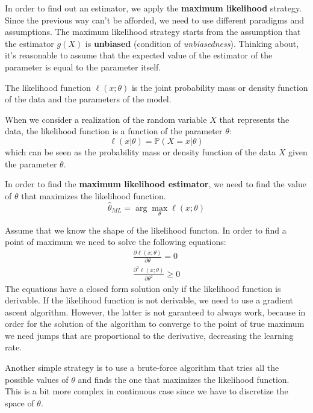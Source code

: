 In order to find out an estimator, we apply the \textbf{maximum likelihood} strategy.
Since the previous way can't be afforded, we need to use different paradigms and assumptions.
The maximum likelihood strategy starts from the assumption that the estimator $g(X)$ is \textbf{unbiased} (condition of \textit{unbiasedness}).
Thinking about, it's reasonable to assume that the expected value of the estimator of the parameter is equal to the parameter itself.
\begin{definition}
    The likelihood function $\ell(x;\theta)$ is the joint probability mass or density function of the data and the parameters of the model.

    When we consider a realization of the random variable $X$ that represents the data, the likelihood function is a function of the parameter $\theta$:
    \[
        \ell(x | \theta) = \mathbb{P}(X = x | \theta)
    \]
    which can be seen as the probability mass or density function of the data $X$ given the parameter $\theta$.
\end{definition}

\begin{theorem}
    In order to find the \textbf{maximum likelihood estimator}, we need to find the value of $\theta$ that maximizes the likelihood function.
    \[
        \hat{\theta}_{ML} = \arg\max_{\theta} \ell(x; \theta)
    \]
\end{theorem}

Assume that we know the shape of the likelihood functon. In order to find a point of maximum we need to solve the following equations:
\begin{align*}
    \frac{\partial \ell(x;\theta)}{\partial \theta} = 0 \\
    \frac{\partial^2 \ell(x;\theta)}{\partial \theta^2} \geq 0
\end{align*}
The equations have a closed form solution only if the likelihood function is derivable. If the likelihood function is not derivable, we need to use a gradient ascent algorithm. However, the latter is not garanteed to always work, because in order for the solution of the algorithm to converge to the point of true maximum we need jumps that are proportional to the derivative, decreasing the learning rate.

Another simple strategy is to use a brute-force algorithm that tries all the possible values of $\theta$ and finds the one that maximizes the likelihood function. This is a bit more complex in continuous case since we have to discretize the space of $\theta$.

